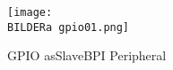 \begin{figure}[H] 
\centering
  \texttt{[image: \\BILDERa gpio01.png]}
\caption{GPIO asSlaveBPI Peripheral}
\label{fig:asgpio01}
\end{figure}
